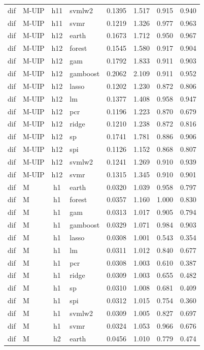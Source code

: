 \begin{ThreePartTable}
\begin{longtable}[t]{llclcccc}
dif & M-UIP & h11 & svmlw2 & 0.1395 & 1.517 & 0.915 & 0.940\\
dif & M-UIP & h11 & svmr & 0.1219 & 1.326 & 0.977 & 0.963\\
\addlinespace
dif & M-UIP & h12 & earth & 0.1673 & 1.712 & 0.950 & 0.967\\
dif & M-UIP & h12 & forest & 0.1545 & 1.580 & 0.917 & 0.904\\
dif & M-UIP & h12 & gam & 0.1792 & 1.833 & 0.911 & 0.903\\
dif & M-UIP & h12 & gamboost & 0.2062 & 2.109 & 0.911 & 0.952\\
dif & M-UIP & h12 & lasso & 0.1202 & 1.230 & 0.872 & 0.806\\
dif & M-UIP & h12 & lm & 0.1377 & 1.408 & 0.958 & 0.947\\
dif & M-UIP & h12 & pcr & 0.1196 & 1.223 & 0.870 & 0.679\\
dif & M-UIP & h12 & ridge & 0.1210 & 1.238 & 0.872 & 0.816\\
dif & M-UIP & h12 & sp & 0.1741 & 1.781 & 0.886 & 0.906\\
dif & M-UIP & h12 & spi & 0.1126 & 1.152 & 0.868 & 0.807\\
dif & M-UIP & h12 & svmlw2 & 0.1241 & 1.269 & 0.910 & 0.939\\
dif & M-UIP & h12 & svmr & 0.1315 & 1.345 & 0.910 & 0.901\\
\addlinespace
dif & M & h1 & earth & 0.0320 & 1.039 & 0.958 & 0.797\\
dif & M & h1 & forest & 0.0357 & 1.160 & 1.000 & 0.830\\
dif & M & h1 & gam & 0.0313 & 1.017 & 0.905 & 0.794\\
dif & M & h1 & gamboost & 0.0329 & 1.071 & 0.984 & 0.903\\
dif & M & h1 & lasso & 0.0308 & 1.001 & 0.543 & 0.354\\
dif & M & h1 & lm & 0.0311 & 1.012 & 0.840 & 0.677\\
dif & M & h1 & pcr & 0.0308 & 1.003 & 0.610 & 0.387\\
dif & M & h1 & ridge & 0.0309 & 1.003 & 0.655 & 0.482\\
dif & M & h1 & sp & 0.0310 & 1.008 & 0.681 & 0.409\\
dif & M & h1 & spi & 0.0312 & 1.015 & 0.754 & 0.360\\
dif & M & h1 & svmlw2 & 0.0309 & 1.005 & 0.827 & 0.697\\
dif & M & h1 & svmr & 0.0324 & 1.053 & 0.966 & 0.676\\
\addlinespace
dif & M & h2 & earth & 0.0456 & 1.010 & 0.779 & 0.474\\

\end{longtable}
\end{ThreePartTable}
